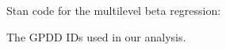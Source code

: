 \documentclass[12pt]{article}
\begin{document}

\clearpage
\noindent
Stan code for the multilevel beta regression:
\begin{scriptsize}

\end{scriptsize}

\clearpage

\noindent
The GPDD IDs used in our analysis.

\begin{footnotesize}
\noindent
{\tt

}
\end{footnotesize}
\normalsize
\end{document}
